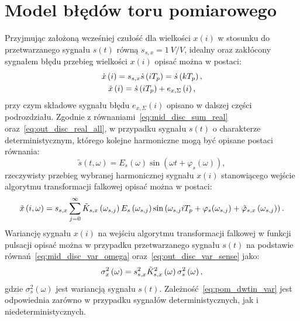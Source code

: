 \section{Model błędów toru pomiarowego}

Przyjmując założoną wcześniej czułość dla wielkości $x(i)$ w stosunku do przetwarzanego sygnału $s(t)$ równą $s_{s,x} = \qty{1}{V \per V}$, idealny oraz zakłócony sygnałem błędu przebieg wielkości $x(i)$ opisać można w postaci:
\begin{gather}
\dot{x} \left(i\right) = s_{s,x} \dot{s} \left(iT_{p}\right) = \dot{s} \left(kT_{p}\right) \label{eq:pom_dwtin_ideal}, \\
\tilde{x} \left(i\right) = \dot{s} \left(iT_{p}\right) + e_{x,\Sigma} \left(i\right) \label{eq:pom_dwtin_real},
\end{gather}
przy czym składowe sygnału błędu $e_{x,\Sigma}(i)$ opisano w dalszej części podrozdziału. Zgodnie z równaniami~\eqref{eq:mid_disc_sum_real} oraz~\eqref{eq:out_disc_real_all}, w przypadku sygnału $s(t)$ o charakterze deterministycznym, którego kolejne harmoniczne mogą być opisane postaci równania:
\begin{equation}
\tilde{s}(t,\omega) = E_{s}(\omega) \sin(\omega t + \varphi_{s}(\omega)) \label{eq:pom_dwtin_harm_ideal},
\end{equation}
rzeczywisty przebieg wybranej harmonicznej sygnału $x(i)$ stanowiącego wejście algorytmu transformacji falkowej opisać można w postaci:
\begin{equation}
\tilde{x} \left(i,\omega\right) =  s_{s,x} \sum_{j = 0} ^{\infty} \tilde{K}_{s,x} \left(\omega_{s,j}\right) E_{s} \left(\omega_{s,j}\right) \sin \left(\omega_{s,j} i T_{p} + \varphi_{s}(\omega_{s,j}) + \tilde{\varphi}_{s,x} \left(\omega_{s,j}\right)\right) \label{eq:pom_dwtin_harmsum}.
\end{equation}
Wariancję sygnału $x(i)$ na wejściu algorytmu transformacji falkowej w funkcji pulsacji opisać można w przypadku przetwarzanego sygnału $s(t)$ na podstawie równań~\eqref{eq:mid_disc_var_omega} oraz~\eqref{eq:out_disc_var_sense} jako:
\begin{equation}
\sigma_{x}^{2} \left(\omega\right) = s_{s,x}^{2} \tilde{K}_{s,x}^{2} \left(\omega\right) \sigma_{s}^{2} \left(\omega\right) \label{eq:pom_dwtin_var},
\end{equation}
gdzie $\sigma_{s}^{2}(\omega)$ jest wariancją sygnału $s(t)$. Zależność~\eqref{eq:pom_dwtin_var} jest odpowiednia zarówno w przypadku sygnałów deterministycznych, jak i niedeterministycznych.


